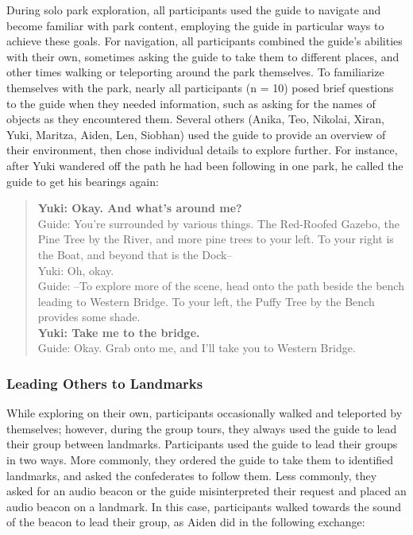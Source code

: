 During solo park exploration, all participants used the guide to navigate and become familiar with park content, employing the guide in particular ways to achieve these goals. For navigation, all participants combined the guide’s abilities with their own, sometimes asking the guide to take them to different places, and other times walking or teleporting around the park themselves. To familiarize themselves with the park, nearly all participants (n = 10) posed brief questions to the guide when they needed information, such as asking for the names of objects as they encountered them. Several others (Anika, Teo, Nikolai, Xiran, Yuki, Maritza, Aiden, Len, Siobhan) used the guide to provide an overview of their environment, then chose individual details to explore further. For instance, after Yuki wandered off the path he had been following in one park, he called the guide to get his bearings again:

\begin{quote}
	\textbf{Yuki: Okay. And what's around me?}\\
Guide: You're surrounded by various things. The Red-Roofed Gazebo, the Pine Tree by the River, and more pine trees to your left. To your right is the Boat, and beyond that is the Dock–\\
Yuki: Oh, okay.\\
Guide: –To explore more of the scene, head onto the path beside the bench leading to Western Bridge. To your left, the Puffy Tree by the Bench provides some shade.\\
\textbf{Yuki: Take me to the bridge.}\\
Guide: Okay. Grab onto me, and I'll take you to Western Bridge.
\end{quote}

\subsubsection{Leading Others to Landmarks} \label{sec: Leading Others to Landmarks}

While exploring on their own, participants occasionally walked and teleported by themselves; however, during the group tours, they always used the guide to lead their group between landmarks. Participants used the guide to lead their groups in two ways. More commonly, they ordered the guide to take them to identified landmarks, and asked the confederates to follow them. Less commonly, they asked for an audio beacon or the guide misinterpreted their request and placed an audio beacon on a landmark. In this case, participants walked towards the sound of the beacon to lead their group, as Aiden did in the following exchange:

